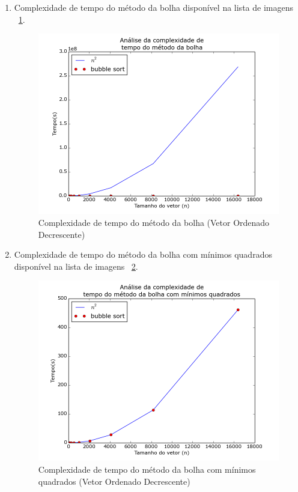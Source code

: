 \documentclass[12pt,a4paper,twoside]{report}
\begin{document}
\begin{enumerate}
\begin{enumerate}
					
					\item Complexidade de tempo do método da bolha disponível na lista de imagens ~\ref{fig:BubblePlot2OD}.
					\begin{figure}[!h]
						\centering
						\includegraphics[scale=0.6]{../imagens/Bubble/bubble_plot_2_ordenado_decrescente.png}
						\caption{Complexidade de tempo do método da bolha (Vetor Ordenado Decrescente) \label{fig:BubblePlot2OD}}
					\end{figure}
					
					
					\item Complexidade de tempo do método da bolha com mínimos quadrados disponível na lista de imagens  ~\ref{fig:BubblePlot3OD}.
					\begin{figure}[!h]
						\centering
						\includegraphics[scale=0.6]{../imagens/Bubble/bubble_plot_3_ordenado_decrescente.png}
						\caption{Complexidade de tempo do método da bolha com mínimos quadrados (Vetor Ordenado Decrescente) \label{fig:BubblePlot3OD}}
					\end{figure}
				

\end{enumerate}
\end{enumerate}
\end{document}
